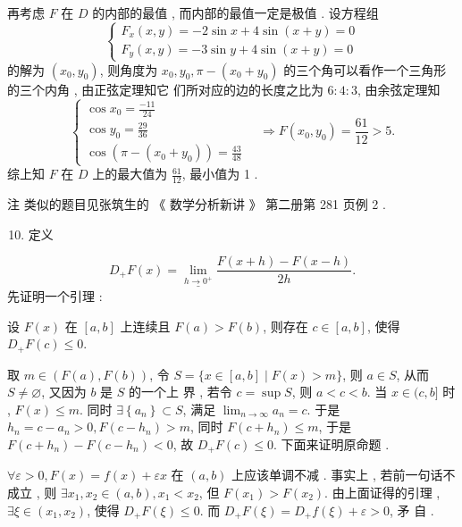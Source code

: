 \documentclass[10pt]{article}
\begin{document}
 再考虑  $F$  在  $D$  的内部的最值 ,  而内部的最值一定是极值 .  设方程组 
$$
\left\{\begin{array}{l}
F_{x}(x, y)=-2 \sin x+4 \sin (x+y)=0 \\
F_{y}(x, y)=-3 \sin y+4 \sin (x+y)=0
\end{array}\right.
$$
 的解为  $\left(x_{0}, y_{0}\right)$,  则角度为  $x_{0}, y_{0}, \pi-\left(x_{0}+y_{0}\right)$  的三个角可以看作一个三角形的三个内角 ,  由正弦定理知它   们所对应的边的长度之比为  $6: 4: 3$,  由余弦定理知 
$$
\left\{\begin{array}{l}
\cos x_{0}=\frac{-11}{24} \\
\cos y_{0}=\frac{29}{36} \\
\cos \left(\pi-\left(x_{0}+y_{0}\right)\right)=\frac{43}{48}
\end{array} \quad \Longrightarrow F\left(x_{0}, y_{0}\right)=\frac{61}{12}>5 .\right.
$$
 综上知  $F$  在  $D$  上的最大值为  $\frac{61}{12}$,  最小值为  1 .

 注   类似的题目见张筑生的 《 数学分析新讲 》 第二册第  281  页例  2 .

\begin{enumerate}
  \setcounter{enumi}{9}
  \item  定义 
\end{enumerate}
$$
D_{+} F(x)=\underline{\lim _{h \rightarrow 0^{+}}} \frac{F(x+h)-F(x-h)}{2 h} .
$$
 先证明一个引理 :

 设  $F(x)$  在  $[a, b]$  上连续且  $F(a)>F(b)$,  则存在  $c \in[a, b]$,  使得  $D_{+} F(c) \leqslant 0$.

 取  $m \in(F(a), F(b))$,  令  $S=\{x \in[a, b] \mid F(x)>m\}$,  则  $a \in S$,  从而  $S \neq \varnothing$,  又因为  $b$  是  $S$  的一个上   界 ,  若令  $c=\sup S$,  则  $a<c<b$.  当  $x \in(c, b]$  时 , $F(x) \leqslant m$.  同时  $\exists\left\{a_{n}\right\} \subset S$,  满足  $\lim _{n \rightarrow \infty} a_{n}=c$.  于是  $h_{n}=c-a_{n}>0, F\left(c-h_{n}\right)>m$,  同时  $F\left(c+h_{n}\right) \leqslant m$,  于是  $F\left(c+h_{n}\right)-F\left(c-h_{n}\right)<0$,  故  $D_{+} F(c) \leqslant 0$.  下面来证明原命题 .

$\forall \varepsilon>0, F(x)=f(x)+\varepsilon x$  在  $(a, b)$  上应该单调不减 .  事实上 ,  若前一句话不成立 ,  则  $\exists x_{1}, x_{2} \in(a, b), x_{1}<x_{2}$,  但  $F\left(x_{1}\right)>F\left(x_{2}\right)$.  由上面证得的引理 , $\exists \xi \in\left(x_{1}, x_{2}\right)$,  使得  $D_{+} F(\xi) \leqslant 0$.  而  $D_{+} F(\xi)=D_{+} f(\xi)+\varepsilon>0$,  矛   自 .
\end{document}
